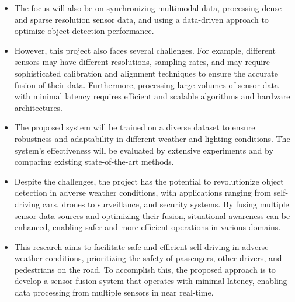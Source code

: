 \documentclass[rnd]{mas_proposal}
\begin{document}
\begin{itemize}
    \item The focus will also be on synchronizing multimodal data, processing dense and sparse resolution sensor data, and using a data-driven approach to optimize object detection performance.

    \item However, this project also faces several challenges. For example, different sensors may have different resolutions, sampling rates, and may require sophisticated calibration and alignment techniques to ensure the accurate fusion of their data. Furthermore, processing large volumes of sensor data with minimal latency requires efficient and scalable algorithms and hardware architectures.

    \item The proposed system will be trained on a diverse dataset to ensure robustness and adaptability in different weather and lighting conditions. The system's effectiveness will be evaluated by extensive experiments and by comparing existing state-of-the-art methods.

    \item Despite the challenges, the project has the potential to revolutionize object detection in adverse weather conditions, with applications ranging from self-driving cars, drones to surveillance, and security systems. By fusing multiple sensor data sources and optimizing their fusion, situational awareness can be enhanced, enabling safer and more efficient operations in various domains.

    \item This research aims to facilitate safe and efficient self-driving in adverse weather conditions, prioritizing the safety of passengers, other drivers, and pedestrians on the road. To accomplish this, the proposed approach is to develop a sensor fusion system that operates with minimal latency, enabling data processing from multiple sensors in near real-time.

          \newpage


\end{itemize}
\end{document}
